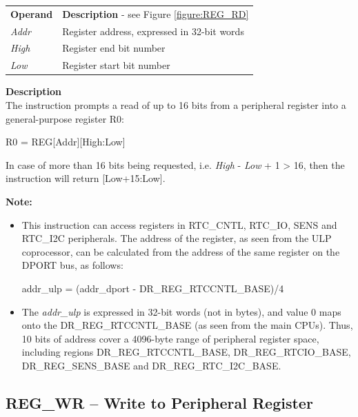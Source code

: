 \documentclass[main\_\_EN.tex]{subfiles}
\begin{document}
\begin{tabular}{ l l }
\textbf{Operand} & \textbf{Description} - see Figure \ref{figure:REG_RD} \\
\textit{Addr} & Register address, expressed in 32-bit words \\
\textit{High} &  Register end bit number \\
\textit{Low} & Register start bit number
\end{tabular}

\textbf{Description} \\
The instruction prompts a read of up to 16 bits from a peripheral register into a general-purpose register R0:

\begin{centering}
    R0 = REG[Addr][High:Low] \\
\end{centering}

In case of more than 16 bits being requested, i.e. \textit{High} - \textit{Low} + 1 > 16, then the instruction will return [Low+15:Low].

\textbf{Note:} \\
\begin{itemize}
    \item This instruction can access registers in RTC\_CNTL, RTC\_IO, SENS and RTC\_I2C peripherals. The address of the register, as seen from the ULP coprocessor, can be calculated from the address of the same register on the DPORT bus, as follows: \\

    \begin{centering}
        addr\_ulp = (addr\_dport - DR\_REG\_RTCCNTL\_BASE)/4 \\
    \end{centering}

    \item The \textit{addr\_ulp} is expressed in 32-bit words (not in bytes), and value 0 maps onto the DR\_REG\_RTCCNTL\_BASE (as seen from the main CPUs). Thus, 10 bits of address cover a 4096-byte range of peripheral register space, including regions DR\_REG\_RTCCNTL\_BASE, DR\_REG\_RTCIO\_BASE, DR\_REG\_SENS\_BASE and DR\_REG\_RTC\_I2C\_BASE.
\end{itemize}


\subsection{REG\_WR – Write to Peripheral Register} \label{subsection:REG_WR}
\end{document}
